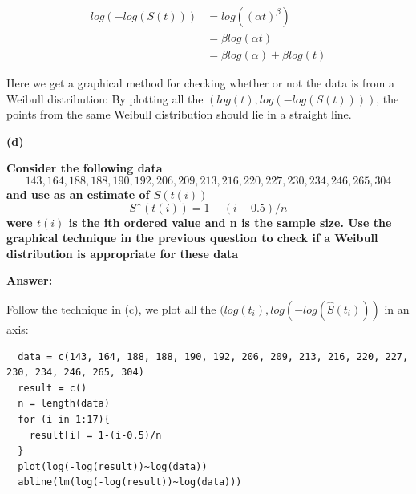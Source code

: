 \documentclass[letterpaper,11pt]{article}
\begin{document}
\begin{align}
log(-log(S(t))) & = log((\alpha t)^{\beta})\nonumber\\
& = \beta log(\alpha t) \nonumber\\
& = \beta log(\alpha) + \beta log(t) \nonumber
\end{align}

Here we get a graphical method for checking whether or not the data is from a Weibull distribution: By plotting all the $(log(t), log(-log(S(t))))$, the points from the same Weibull distribution should lie in a straight line.


\begin{addmargin}[-1.1em]{0em}
  \textbf{(d)}\par
\end{addmargin}
\textbf{Consider the following data}
$$143, 164, 188, 188, 190, 192, 206, 209, 213, 216, 220, 227, 230, 234, 246, 265, 304$$
\textbf{and use as an estimate of $S(t(i))$}
$$Sˆ(t(i)) = 1 − (i - 0.5)/n$$
\textbf{were $t(i)$ is the ith ordered value and n is the sample size. Use the graphical technique
in the previous question to check if a Weibull distribution is appropriate for these data}\par
\bigbreak
\begin{addmargin}[-0.5em]{0em}
  \textbf{Answer: }
\end{addmargin}

Follow the technique in (c), we plot all the $(log(t_i), log(-log(\hat{S}(t_i)))$ in an axis:
\begin{lstlisting}
  data = c(143, 164, 188, 188, 190, 192, 206, 209, 213, 216, 220, 227, 230, 234, 246, 265, 304)
  result = c()
  n = length(data)
  for (i in 1:17){
    result[i] = 1-(i-0.5)/n
  }
  plot(log(-log(result))~log(data))
  abline(lm(log(-log(result))~log(data)))
\end{lstlisting}
\end{document}
